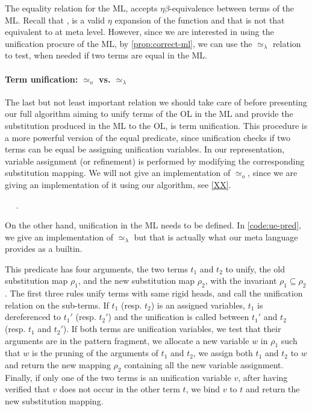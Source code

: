 \documentclass[sigconf,natbib=false,review]{acmart}
\newcommand{\UnifRel}{\ensuremath{\simeq}}
\newcommand{\Uo}{\ensuremath{\UnifRel_o}\xspace}
\newcommand{\Ue}{\ensuremath{\UnifRel_\lambda}\xspace}
\begin{document}
\noindent
The equality relation for the ML, accepts $\eta\beta$-equivalence between terms
of the ML. Recall that , is a valid $\eta$ expansion of the
function  and that  is not that equivalent to
 at meta level. However, since we are interested in using the
unification procure of the ML, by \cref{prop:correct-ml}, we can use the
\Ue relation to test, when needed if two terms are equal in the ML.

\paragraph{Term unification: \Uo vs. \Ue} 
The last but not least important relation we should take care of before
presenting our full algorithm aiming to unify terms of the OL in the ML and
provide the substitution produced in the ML to the OL, is term unification. This
procedure is a more powerful version of the equal predicate, since unification
checks if two terms can be equal be assigning unification variables. In our
representation, variable assignment (or refinement) is performed by modifying
the corresponding substitution mapping. We will not give an implementation of
\Uo, since we are giving an implementation of it using
our algorithm, see \cref{XX}.

\begin{elpicode}
~ \PYG{n+nf}{(\Ue)} ~.
\end{elpicode}

On the other hand, unification in the ML needs to be defined. In
\cref{code:ue-pred}, we give an implementation of \Ue but
that is actually what our meta language provides as a builtin.

This predicate has four
arguments, the two terms $t_1$ and $t_2$ to unify, the old substitution map
$\rho_1$, and the new substitution map $\rho_2$, with the invariant $\rho_1
\subseteq \rho_2$. The first three rules unify terms with same rigid heads, and
call the unification relation on the sub-terms. If $t_1$ (resp. $t_2$) is an
assigned variables, $t_1$ is dereferenced to $t_1'$ (resp. $t_2'$) and the
unification is called between $t_1'$ and $t_2$ (resp. $t_1$ and $t_2'$). If both
terms are unification variables, we test that their arguments are in the pattern
fragment, we allocate a new variable $w$ in $\rho_1$ such that $w$ is the
pruning of the arguments of $t_1$ and $t_2$, we assign both $t_1$ and $t_2$ to
$w$ and return the new mapping $\rho_2$ containing all the new variable
assignment. Finally, if only one of the two terms is an unification variable
$v$, after having verified that $v$ does not occur in the other term $t$, we
bind $v$ to $t$ and return the new substitution mapping.
\end{document}
